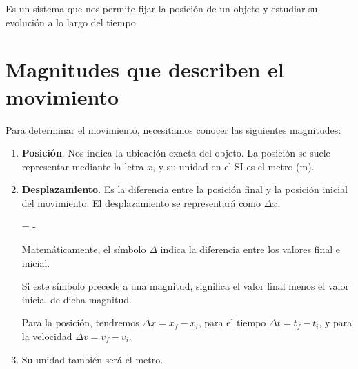 \vspace*{6pt}
\begin{definition}
         Es un sistema que nos permite fijar la posición de un objeto y estudiar su evolución a lo largo del tiempo.
\end{definition}

\section{Magnitudes que describen el movimiento}

Para determinar el movimiento, necesitamos conocer las siguientes magnitudes:

\begin{enumerate}[label=\numberballmDarkTeal]
        \item \textbf{Posición}.
        Nos indica la ubicación exacta del objeto.
        La posición se suele representar mediante la letra \( x \), y su unidad en el SI es el metro (\( \unit{\metre} \)).

        \item \textbf{Desplazamiento}.
        Es la diferencia entre la posición final y la posición inicial del movimiento.
        El desplazamiento se representará como \( \Delta x \):

        \vspace*{20pt}
        \begin{centeredequation}
            =
            -
        \end{centeredequation}
        \vspace{25pt}

        Matemáticamente, el símbolo \( \Delta \) indica la diferencia entre los valores final e inicial.

        Si este símbolo precede a una magnitud, significa el valor final menos el valor inicial de dicha magnitud.

        Para la posición, tendremos \( \Delta x = x_f - x_i \), para el tiempo \( \Delta t = t_f - t_i \), y para la velocidad \( \Delta v = v_f - v_i \).

        \item Su unidad también será el metro.


\end{enumerate}
